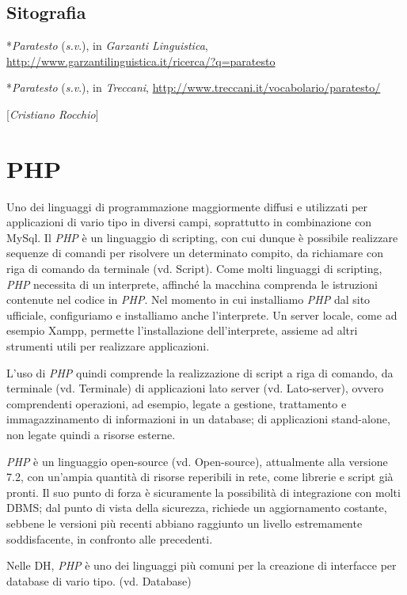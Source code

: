 \section*{Sitografia}
{\parindent0pt 
*\emph{Paratesto} (\emph{s.v}.), in \emph{Garzanti Linguistica},
\url{http://www.garzantilinguistica.it/ricerca/?q=paratesto}

*\emph{Paratesto} (\emph{s.v}.), in \emph{Treccani},
\url{http://www.treccani.it/vocabolario/paratesto/}
}

\hrulefill 

{[}\emph{Cristiano Rocchio}{]}




\chapter{PHP}

Uno dei linguaggi di programmazione maggiormente diffusi e utilizzati
per applicazioni di vario tipo in diversi campi, soprattutto in
combinazione con MySql. Il \emph{PHP} è un linguaggio di scripting, con
cui dunque è possibile realizzare sequenze di comandi per risolvere un
determinato compito, da richiamare con riga di comando da terminale (vd.
Script). Come molti linguaggi di scripting, \emph{PHP} necessita di un
interprete, affinché la macchina comprenda le istruzioni contenute nel
codice in \emph{PHP}. Nel momento in cui installiamo \emph{PHP} dal sito
ufficiale, configuriamo e installiamo anche l'interprete. Un server
locale, come ad esempio Xampp, permette l'installazione dell'interprete,
assieme ad altri strumenti utili per realizzare applicazioni.

L'uso di \emph{PHP} quindi comprende la realizzazione di script a riga
di comando, da terminale (vd. Terminale) di applicazioni lato server
(vd. Lato-server), ovvero comprendenti operazioni, ad esempio, legate a
gestione, trattamento e immagazzinamento di informazioni in un database;
di applicazioni stand-alone, non legate quindi a risorse esterne.

\emph{PHP} è un linguaggio open-source (vd. Open-source), attualmente
alla versione 7.2, con un'ampia quantità di risorse reperibili in rete,
come librerie e script già pronti. Il suo punto di forza è sicuramente
la possibilità di integrazione con molti DBMS; dal punto di vista della
sicurezza, richiede un aggiornamento costante, sebbene le versioni più
recenti abbiano raggiunto un livello estremamente soddisfacente, in
confronto alle precedenti.

Nelle DH, \emph{PHP} è uno dei linguaggi più comuni per la creazione di
interfacce per database di vario tipo. (vd. Database)

